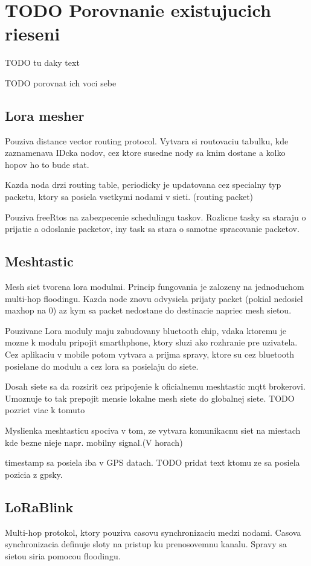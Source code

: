 \documentclass[czech,master]{diploma}
\begin{document}
\chapter{TODO Porovnanie existujucich rieseni}
TODO tu daky text

TODO porovnat ich voci sebe

\section{Lora mesher}
Pouziva distance vector routing protocol.
Vytvara si routovaciu tabulku, kde zaznamenava IDcka nodov, cez ktore susedne nody sa knim dostane a kolko hopov ho to bude stat.

Kazda noda drzi routing table, periodicky je updatovana cez specialny typ packetu, ktory sa posiela vsetkymi nodami v sieti. (routing packet)

Pouziva freeRtos na zabezpecenie schedulingu taskov. Rozlicne tasky sa staraju o prijatie a odoslanie packetov, iny task sa stara o samotne spracovanie packetov.

\section{Meshtastic}
Mesh siet tvorena lora modulmi. Princip fungovania je zalozeny na jednoduchom multi-hop floodingu.
Kazda node znovu odvysiela prijaty packet (pokial nedosiel maxhop na 0) az kym sa packet nedostane do destinacie napriec mesh sietou.

Pouzivane Lora moduly maju zabudovany bluetooth chip, vdaka ktoremu je mozne k modulu pripojit smarthphone, ktory sluzi ako rozhranie pre
 uzivatela. Cez aplikaciu v mobile potom vytvara a prijma spravy, ktore su cez bluetooth posielane do modulu a cez lora sa posielaju do siete.

Dosah siete sa da rozsirit cez pripojenie k oficialnemu meshtastic mqtt brokerovi. Umoznuje to tak prepojit mensie lokalne mesh siete do globalnej siete. TODO pozriet viac k tomuto

Myslienka meshtasticu spociva v tom, ze vytvara komunikacnu siet na miestach kde bezne nieje napr. mobilny signal.(V horach)

timestamp sa posiela iba v GPS datach. TODO pridat text ktomu ze sa posiela pozicia z gpsky.

\section{LoRaBlink}
Multi-hop protokol, ktory pouziva casovu synchronizaciu medzi nodami. Casova synchronizacia definuje sloty na pristup ku prenosovemnu kanalu.
Spravy sa sietou siria pomocou floodingu.
\end{document}
